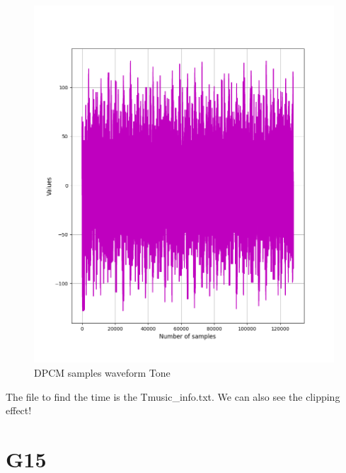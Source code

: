 \documentclass[hidelinks, 12pt, a4paper]{article}
\begin{document}
\begin{figure}[h!]
\centering
	\includegraphics[height=.4\textheight, width=\textwidth]{assets/session1/g10.png}
	\caption{DPCM samples waveform Tone} 
\end{figure}

The file to find the time is the Tmusic\_info.txt. We can also see the clipping effect!

\section{G15}
\end{document}

